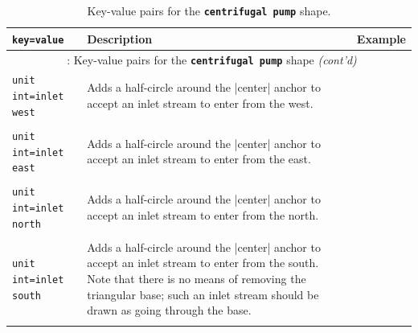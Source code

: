 \documentclass[11pt]{article}
\newcommand\boldtt[1]{\textbf{\texttt{#1}}}
\begin{document}
\begin{center}
	\begin{longtable}{p{1.75in}p{3in}c}
		\caption{Key-value pairs for the \boldtt{centrifugal pump} shape.}\\
		\toprule
		\texttt{key=value} & Description & Example \\
		\midrule
		\endfirsthead
		
		\multicolumn{3}{c}{\tablename\ \thetable: Key-value pairs for the \boldtt{centrifugal pump} shape \textit{(cont'd)}} \\
		\midrule
		\endhead
		
		\bottomrule
		\endfoot
		
		\bottomrule
		\endlastfoot
		
		\texttt{unit int=inlet west} & Adds a half-circle around the |center| anchor to accept an inlet stream to enter from the west. & 
		\adjustbox{valign=t}{
			\begin{tikzpicture}
				\node[centrifugal pump, unit int=inlet west] (f) {};
		\end{tikzpicture}} \\
		& & \\
		
		\texttt{unit int=inlet east} & Adds a half-circle around the |center| anchor to accept an inlet stream to enter from the east. & 
		\adjustbox{valign=t}{
			\begin{tikzpicture}
				\node[centrifugal pump, unit int=inlet east] (f) {};
		\end{tikzpicture}} \\
		& & \\
		
		\texttt{unit int=inlet north} & Adds a half-circle around the |center| anchor to accept an inlet stream to enter from the north. & 
		\adjustbox{valign=t}{
			\begin{tikzpicture}
				\node[centrifugal pump, unit int=inlet north] (f) {};
		\end{tikzpicture}} \\
		& & \\
		
		\texttt{unit int=inlet south} & Adds a half-circle around the |center| anchor to accept an inlet stream to enter from the south. Note that there is no means of removing the triangular base; such an inlet stream should be drawn as going through the base. & 
		\adjustbox{valign=t}{
			\begin{tikzpicture}
				\node[centrifugal pump, unit int=inlet south] (f) {};
		\end{tikzpicture}} \\
		& & \\
		

\end{longtable}
\end{center}
\end{document}
